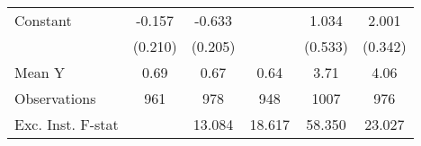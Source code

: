 {\begin{tabular}{l*{5}{c}}
\addlinespace
Constant            &      -0.157         &      -0.633\sym{***}&                     &       1.034\sym{*}  &       2.001\sym{***}\\
                    &     (0.210)         &     (0.205)         &                     &     (0.533)         &     (0.342)         \\
\midrule
Mean Y              &        0.69         &        0.67         &        0.64         &        3.71         &        4.06         \\
Observations        &         961         &         978         &         948         &        1007         &         976         \\
Exc. Inst. F-stat   &                     &      13.084         &      18.617         &      58.350         &      23.027         \\
\bottomrule
\end{tabular}
}
